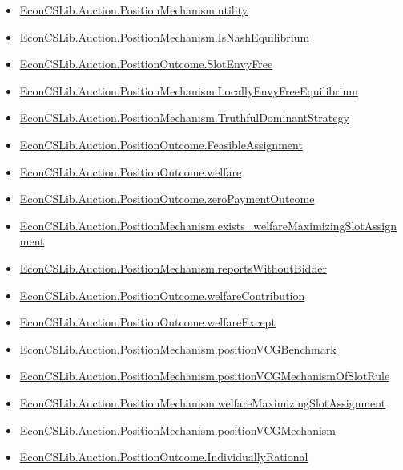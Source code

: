 \documentclass[10pt]{article}
\begin{document}
\begin{itemize}[leftmargin=1.2em]
\begin{itemize}[leftmargin=1.2em]
\item \hyperlink{library-prerequisite-2c3f40d79786cdf7}{EconCSLib.Auction.PositionMechanism.utility}
\item \hyperlink{library-prerequisite-9a2d5b93af1a3ce5}{EconCSLib.Auction.PositionMechanism.IsNashEquilibrium}
\item \hyperlink{library-prerequisite-ed5a3a7b2c3c75e1}{EconCSLib.Auction.PositionOutcome.SlotEnvyFree}
\item \hyperlink{library-prerequisite-1d0ab55a6e6aafea}{EconCSLib.Auction.PositionMechanism.LocallyEnvyFreeEquilibrium}
\item \hyperlink{library-prerequisite-e780a5764067e856}{EconCSLib.Auction.PositionMechanism.TruthfulDominantStrategy}
\item \hyperlink{library-prerequisite-24d7cc1d613625d1}{EconCSLib.Auction.PositionOutcome.FeasibleAssignment}
\item \hyperlink{library-prerequisite-f622cd83e9a3edd0}{EconCSLib.Auction.PositionOutcome.welfare}
\item \hyperlink{library-prerequisite-60a26012de5e6086}{EconCSLib.Auction.PositionOutcome.zeroPaymentOutcome}
\item \hyperlink{library-prerequisite-5fd3a74acb81b123}{EconCSLib.Auction.PositionMechanism.exists\_welfareMaximizingSlotAssignment}
\item \hyperlink{library-prerequisite-67f653e5aa8c0431}{EconCSLib.Auction.PositionMechanism.reportsWithoutBidder}
\item \hyperlink{library-prerequisite-6b13695c47a4b5b3}{EconCSLib.Auction.PositionOutcome.welfareContribution}
\item \hyperlink{library-prerequisite-3c2606605547cbc2}{EconCSLib.Auction.PositionOutcome.welfareExcept}
\item \hyperlink{library-prerequisite-efaf5d0703a81f72}{EconCSLib.Auction.PositionMechanism.positionVCGBenchmark}
\item \hyperlink{library-prerequisite-3dc24978496adf46}{EconCSLib.Auction.PositionMechanism.positionVCGMechanismOfSlotRule}
\item \hyperlink{library-prerequisite-57931c2dacf63c9d}{EconCSLib.Auction.PositionMechanism.welfareMaximizingSlotAssignment}
\item \hyperlink{library-prerequisite-26282b87d8316eeb}{EconCSLib.Auction.PositionMechanism.positionVCGMechanism}
\item \hyperlink{library-prerequisite-ec8ee53f3c878acb}{EconCSLib.Auction.PositionOutcome.IndividuallyRational}

\end{itemize}
\end{itemize}
\end{document}
